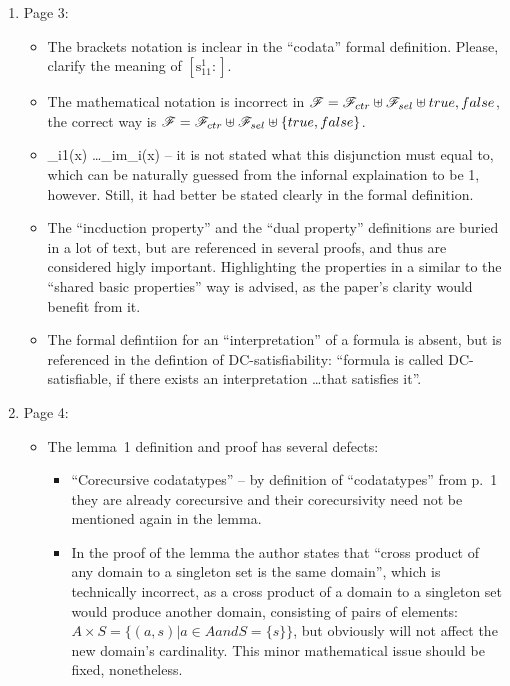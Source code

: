 \begin{enumerate}
	\item Page 3:
	\begin{itemize}
		\item The brackets notation is inclear in the ``codata'' formal definition. Please, clarify the meaning of $\left[ \mathrm{s}^{1}_{11} : \right]$.
		\item The mathematical notation is incorrect in $\mathscr{F} = \mathscr{F}_{ctr} \uplus \mathscr{F}_{sel} \uplus true,false$, the correct way is $\mathscr{F} = \mathscr{F}_{ctr} \uplus \mathscr{F}_{sel} \uplus \{true,false\}$.
		\item {}_{i1}(x) \lor \dots \lor {}_{im_i}(x) -- it is not stated what this disjunction must equal to, which can be naturally guessed from the infornal explaination to be 1, however. Still, it had better be stated clearly in the formal definition.
		\item The ``incduction property'' and the ``dual property'' definitions are buried in a lot of text, but are referenced in several proofs, and thus are considered higly important. Highlighting the properties in a similar to the ``shared basic properties'' way is advised, as the paper's clarity would benefit from it.
		\item The formal defintiion for an ``interpretation'' of a formula is absent, but is referenced in the defintion of DC-satisfiability: ``formula is called DC-satisfiable, if there exists an interpretation \dots that satisfies it''.
	\end{itemize}

	\item Page 4:
	\begin{itemize}
		\item The lemma~1 definition and proof has several defects:
		\begin{itemize}
			\item ``Corecursive codatatypes'' -- by definition of ``codatatypes'' from p.~1 they are already corecursive and their corecursivity need not be mentioned again in the lemma.
			\item In the proof of the lemma the author states that ``cross product of any domain to a singleton set is the same domain'', which is technically incorrect, as a cross product of a domain to a singleton set would produce another domain, consisting of pairs of elements: $A \times S = \{ (a, s) | a \in A and S = \{s\} \}$, but obviously will not affect the new domain's cardinality. This minor mathematical issue should be fixed, nonetheless.
		\end{itemize}
	\end{itemize}


\end{enumerate}
